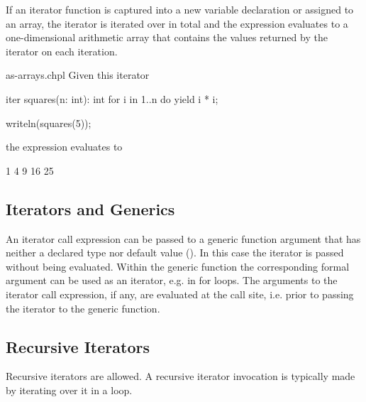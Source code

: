 If an iterator function is captured into a new variable declaration or
assigned to an array, the iterator is iterated over in total and the
expression evaluates to a one-dimensional arithmetic array that
contains the values returned by the iterator on each iteration.
\begin{chapelexample}{as-arrays.chpl}
Given this iterator
\begin{chapel}
iter squares(n: int): int {
  for i in 1..n do
    yield i * i;
}
\end{chapel}
\begin{chapelpost}
writeln(squares(5));
\end{chapelpost}
the expression  evaluates to
\begin{chapelprintoutput}{}
1 4 9 16 25
\end{chapelprintoutput}
\end{chapelexample}

\subsection{Iterators and Generics}
\label{Iterators_and_Generics}

An iterator call expression can be passed to a generic function argument that
has neither a declared type nor default value
().
In this case the iterator is passed without being evaluated.
Within the generic function the corresponding formal argument
can be used as an iterator, e.g. in for loops.
The arguments to the iterator call expression, if any, are evaluated
at the call site, i.e. prior to passing the iterator to the generic function.

\subsection{Recursive Iterators}
\label{Recursive_Iterators}

Recursive iterators are allowed. A recursive iterator invocation is
typically made by iterating over it in a loop.


